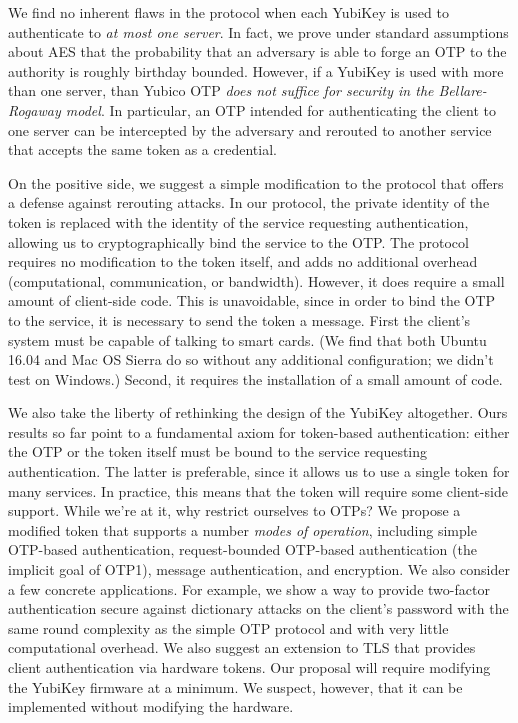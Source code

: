 We find no inherent flaws in the protocol when each YubiKey is used to
authenticate to \emph{at most one server}. In fact, we prove under standard
assumptions about AES that the probability that an adversary is able to forge an OTP to
the authority is roughly birthday bounded.
%
However, if a YubiKey is used with more than one server, than Yubico OTP
\emph{does not suffice for security in the Bellare-Rogaway model}.
%
In particular, an OTP intended for authenticating the client to one server can
be intercepted by the adversary and rerouted to another service that accepts the
same token as a credential.

On the positive side, we suggest a simple modification to the protocol that
offers a defense against rerouting attacks. In our protocol, the private
identity of the token is replaced with the identity of the service requesting
authentication, allowing us to cryptographically bind the service to the OTP.
%
The protocol requires no modification to the token itself, and adds no
additional overhead (computational, communication, or bandwidth). However, it
does require a small amount of client-side code. This is unavoidable, since in order to
bind the OTP to the service, it is necessary to send the token a message. First
the client's system must be capable of talking to smart cards. (We find that
both Ubuntu 16.04 and Mac OS Sierra do so without any additional
configuration; we didn't test on Windows.)
%
\fi
%
Second, it requires the installation of a small amount of code.

We also take the liberty of rethinking the design of the YubiKey altogether.
%
Ours results so far point to a fundamental axiom for token-based authentication:
either the OTP or the token itself must be bound to the service requesting
authentication. The latter is preferable, since it allows us to use a single
token for many services.
%
In practice, this means that the token will require some client-side support.
While we're at it, why restrict ourselves to OTPs?
%
We propose a modified token that supports a number \emph{modes of operation},
including simple OTP-based authentication, request-bounded OTP-based
authentication (the implicit goal of OTP1), message authentication, and
encryption.
%
We also consider a few concrete applications. For example, we show a way to provide
two-factor authentication secure against dictionary attacks on the client's
password with the same round complexity as the simple OTP protocol and with very
little computational overhead. We also suggest an extension to TLS that provides
client authentication via hardware tokens.
%
Our proposal will require modifying the YubiKey firmware at a minimum. We
suspect, however, that it can be implemented without modifying the hardware.

